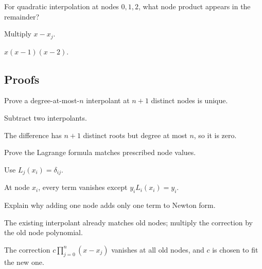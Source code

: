 \begin{exercise}\label{exr:ii20-expand-05}
For quadratic interpolation at nodes \(0,1,2\), what node product appears in the remainder?
\end{exercise}
\begin{hint}
Multiply \(x-x_j\).
\end{hint}
\begin{solution}
\(x(x-1)(x-2)\).
\end{solution}

\subsection*{Proofs}

\begin{exercise}[Uniqueness]\label{exr:ii20-expand-06}
Prove a degree-at-most-\(n\) interpolant at \(n+1\) distinct nodes is unique.
\end{exercise}
\begin{hint}
Subtract two interpolants.
\end{hint}
\begin{solution}
The difference has \(n+1\) distinct roots but degree at most \(n\), so it is zero.
\end{solution}

\begin{exercise}\label{exr:ii20-expand-07}
Prove the Lagrange formula matches prescribed node values.
\end{exercise}
\begin{hint}
Use \(L_j(x_i)=\delta_{ij}\).
\end{hint}
\begin{solution}
At node \(x_i\), every term vanishes except \(y_iL_i(x_i)=y_i\).
\end{solution}

\begin{exercise}\label{exr:ii20-expand-08}
Explain why adding one node adds only one term to Newton form.
\end{exercise}
\begin{hint}
The existing interpolant already matches old nodes; multiply the correction by the old node polynomial.
\end{hint}
\begin{solution}
The correction \(c\prod_{j=0}^n(x-x_j)\) vanishes at all old nodes, and \(c\) is chosen to fit the new one.
\end{solution}

